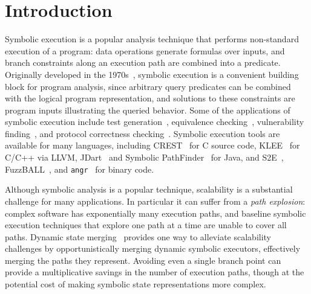 \section{Introduction}
%
Symbolic execution is a popular analysis technique that performs non-standard execution of a program: data operations generate formulas over inputs, and  branch constraints along an execution path are combined into a predicate.
%
Originally developed in the 1970s~\cite{King1976,Clarke1976}, symbolic execution is a convenient building block for
program analysis, since arbitrary query predicates can be combined with the logical program representation, and
solutions to these constraints are program inputs illustrating the queried behavior.
%
Some of the applications of symbolic execution include
test generation~\cite{dart,cute}, equivalence checking~\cite{ramos,adaptorsynth}, vulnerability finding~\cite{driller,angr}, and protocol correctness checking~\cite{transport}.
%
Symbolic execution tools are available for many languages, including
CREST~\cite{BurnimS2008} for C source code, KLEE~\cite{CadarDE2008}
for C/C++ via LLVM, JDart~\cite{jdart2016} and Symbolic
PathFinder~\cite{spf} for Java, and S2E~\cite{ChipounovKC2012},
FuzzBALL~\cite{BabicMMS2011}, and {\tt angr}~\cite{angr} for binary code.
%
%


Although symbolic analysis is a popular technique, scalability is a substantial challenge for many applications.
%
In particular it can suffer from a {\em path explosion}: complex
software has exponentially many execution paths, and baseline symbolic
execution techniques that explore one path at a time are unable to
cover all paths.
%
Dynamic state merging~\cite{HansenSS2009,kuznetsov} provides one way to
alleviate scalability challenges by opportunistically merging dynamic
symbolic executors, effectively merging the paths they represent.
%
Avoiding even a single branch point can provide a multiplicative
savings in the number of execution paths, though at the potential cost
of making symbolic state representations more complex.


